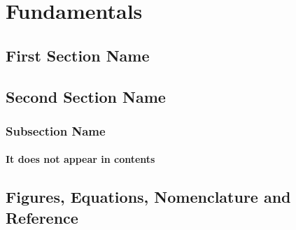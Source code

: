 \chapter{Fundamentals}
\section{First Section Name}
\lipsum[1-7]

\section{Second Section Name}
\subsection{Subsection Name}
\lipsum[1-4]

\subsubsection{It does not appear in contents}
\lipsum[1-2]

\section{Figures, Equations, Nomenclature and Reference}
%


